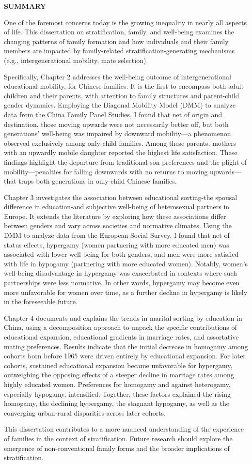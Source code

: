 \begin{center}
    {\large \textbf{SUMMARY}}
\end{center}

\thispagestyle{plain}

One of the foremost concerns today is the growing inequality in nearly all aspects of life. This dissertation on stratification, family, and well-being examines the changing patterns of family formation and how individuals and their family members are impacted by family-related stratification-generating mechanisms (e.g., intergenerational mobility, mate selection).

Specifically, Chapter 2 addresses the well-being outcome of intergenerational educational mobility, for Chinese families. It is the first to encompass both adult children and their parents, with attention to family structures and parent-child gender dynamics. Employing the Diagonal Mobility Model (DMM) to analyze data from the China Family Panel Studies, I found that net of origin and destination, those moving upwards were not necessarily better off, but both generations' well-being was impaired by downward mobility—a phenomenon observed exclusively among only-child families. Among these parents, mothers with an upwardly mobile daughter reported the highest life satisfaction. These findings highlight the departure from traditional son preferences and the plight of mobility—penalties for falling downwards with no returns to moving upwards—that traps both generations in only-child Chinese families.

Chapter 3 investigates the association between educational sorting-the spousal difference in education-and subjective well-being of heterosexual partners in Europe. It extends the literature by exploring how these associations differ between genders and vary across societies and normative climates. Using the DMM to analyze data from the European Social Survey, I found that net of status effects, hypergamy (women partnering with more educated men) was associated with lower well-being for both genders, and men were more satisfied with life in hypogamy (partnering with more educated women). Notably, women's well-being disadvantage in hypergamy was exacerbated in contexts where such partnerships were less normative. In other words, hypergamy may become even more unfavorable for women over time, as a further decline in hypergamy is likely in the foreseeable future.

Chapter 4 documents and explains the trends in marital sorting by education in China, using a decomposition approach to unpack the specific contributions of educational expansion, educational gradients in marriage rates, and assortative mating preferences. Results indicate that the initial decrease in homogamy among cohorts born before 1965 were driven entirely by educational expansion. For later cohorts, sustained educational expansion became unfavorable for hypergamy, outweighing the opposing effects of a steeper decline in marriage rates among highly educated women. Preferences for homogamy and against heterogamy, especially hypogamy, intensified. Together, these factors explained the rising homogamy, the declining hypergamy, the stagnant hypogamy, as well as the converging urban-rural disparities across later cohorts.

This dissertation contributes to a more nuanced understanding of the experience of families in the context of stratification. Future research should explore the emergence of non-conventional family forms and the broader implications of stratification.

\clearpage